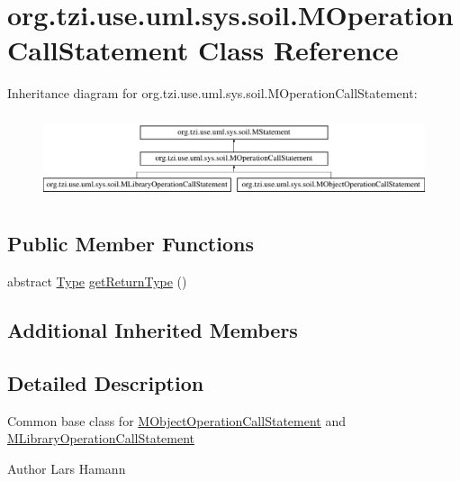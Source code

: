 \hypertarget{classorg_1_1tzi_1_1use_1_1uml_1_1sys_1_1soil_1_1_m_operation_call_statement}{\section{org.\-tzi.\-use.\-uml.\-sys.\-soil.\-M\-Operation\-Call\-Statement Class Reference}
\label{classorg_1_1tzi_1_1use_1_1uml_1_1sys_1_1soil_1_1_m_operation_call_statement}
}
Inheritance diagram for org.\-tzi.\-use.\-uml.\-sys.\-soil.\-M\-Operation\-Call\-Statement\-:\begin{figure}[H]
\begin{center}
\leavevmode
\includegraphics[height=2.500000cm]{classorg_1_1tzi_1_1use_1_1uml_1_1sys_1_1soil_1_1_m_operation_call_statement}
\end{center}
\end{figure}
\subsection*{Public Member Functions}
\begin{DoxyCompactItemize}
\item 
abstract \hyperlink{interfaceorg_1_1tzi_1_1use_1_1uml_1_1ocl_1_1type_1_1_type}{Type} \hyperlink{classorg_1_1tzi_1_1use_1_1uml_1_1sys_1_1soil_1_1_m_operation_call_statement_a8992270381e341826b164853e84e6bed}{get\-Return\-Type} ()
\end{DoxyCompactItemize}
\subsection*{Additional Inherited Members}


\subsection{Detailed Description}
Common base class for \hyperlink{classorg_1_1tzi_1_1use_1_1uml_1_1sys_1_1soil_1_1_m_object_operation_call_statement}{M\-Object\-Operation\-Call\-Statement} and \hyperlink{classorg_1_1tzi_1_1use_1_1uml_1_1sys_1_1soil_1_1_m_library_operation_call_statement}{M\-Library\-Operation\-Call\-Statement} \begin{DoxyAuthor}{Author}
Lars Hamann 
\end{DoxyAuthor}


